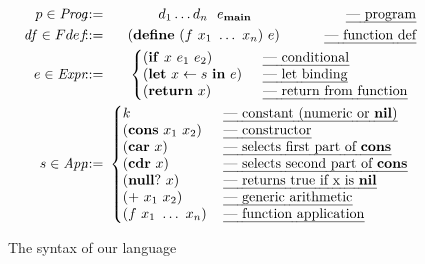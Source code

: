 \documentclass[9pt,nonatbib]{sigplanconf}
\newcommand{\ID}{\mbox{$\mathbf{ id}$}}
\begin{document}
\begin{figure}[t]\footnotesize
\renewcommand{\arraystretch}{0.9}
\begin{eqnarray*}
   p \in \mathit{Prog} & \!\!\!::=\!\!\! & d_1 \ldots d_n \,\,\,\, e_\mainpgm
   \hspace{5em} \,\,\,\,\,\,\,\,\,\; \mbox{\em --- program}\\
    \mathit{df} \in Fdef & \!\!\!::=\!\!\! & (\DEFINE\,\, (f\,\, x_1 \,\, \ldots
\,\,x_n)\,\,
    e)
    \hspace{0.2em} \ \ \ \ \ \ \ \ \  \mbox{\em --- function def} \\
e \in \mathit{Expr} & \!\!\!::=\!\!\! &
\left\{\begin{array}{@{}ll@{\hspace{1em}}l}
       (\SIF\,\, x\,\, e_1\,\, e_2) && \!\!\!\mbox{\em --- conditional} \\
       (\LET\,\, x \leftarrow s\,\, \IN\,\, e) &&\!\!\! \mbox{\em --- let
binding} \\
       (\SRETURN\,\, x) && \!\!\!\mbox{\em --- return from function}
    \end{array}\right. \\
s \in \mathit{App} & \!\!\!::=\!\!\!  &
\left\{\begin{array}{@{}l@{\hspace{1.2em}}l}
       k & \mbox{\em --- constant (numeric or $\NIL$)}\\
       (\CONS\,\, x_1\,\, x_2) & \mbox{\em --- constructor} \\
       (\CAR\,\, x) &  \mbox{\em --- selects first part of \CONS} \\
       (\CDR\,\, x) & \mbox{\em --- selects second part of \CONS} \\
       (\NULLQ\,\, x) & \mbox{\em --- returns true if x is $\NIL$}\\
       (\PRIM\,\, x_1\,\, x_2) & \mbox{\em ---  generic arithmetic} \\
       (f\,\, x_1\,\,\ldots\,\, x_n) & \mbox{\em --- function application}
    \end{array}\right.
\end{eqnarray*}
\vspace*{-6pt}
  \caption{The syntax of our language}\label{fig:lang-syntax}
\normalsize
\vspace*{-6pt}
\end{figure}
\end{document}

